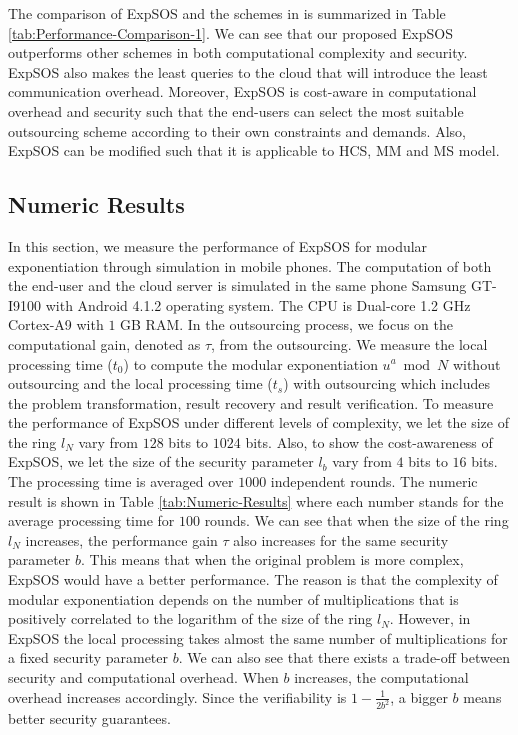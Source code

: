 \documentclass[english,draftcls,onecolumn,11pt]{IEEEtran}
\theoremstyle{definition}
\theoremstyle{plain}
\theoremstyle{plain}
\theoremstyle{definition}
\begin{document}
The comparison of ExpSOS and the schemes in \cite{hohenberger2005securely,chen2012new,wang2014securely}
is summarized in Table \ref{tab:Performance-Comparison-1}. We can
see that our proposed ExpSOS outperforms other schemes in both computational
complexity and security. ExpSOS also makes the least queries to the
cloud that will introduce the least communication overhead. Moreover,
ExpSOS is cost-aware in computational overhead and security such that
the end-users can select the most suitable outsourcing scheme according
to their own constraints and demands. Also, ExpSOS can be modified
such that it is applicable to HCS, MM and MS model.


\subsection{Numeric Results}

In this section, we measure the performance of ExpSOS for modular
exponentiation through simulation in mobile phones. The computation
of both the end-user and the cloud server is simulated in the same
phone Samsung GT-I9100 with Android 4.1.2 operating system. The CPU
is Dual-core 1.2 GHz Cortex-A9 with $1$ GB RAM. In the outsourcing
process, we focus on the computational gain, denoted as $\tau$, from
the outsourcing. We measure the local processing time ($t_{0}$) to
compute the modular exponentiation $u^{a}\bmod N$ without outsourcing
and the local processing time ($t_{s}$) with outsourcing which includes
the problem transformation, result recovery and result verification.
To measure the performance of ExpSOS under different levels of complexity,
we let the size of the ring $l_{N}$ vary from $128$ bits to $1024$
bits. Also, to show the cost-awareness of ExpSOS, we let the size
of the security parameter $l_{b}$ vary from $4$ bits to $16$ bits.
The processing time is averaged over $1000$ independent rounds. The
numeric result is shown in Table \ref{tab:Numeric-Results} where
each number stands for the average processing time for $100$ rounds.
We can see that when the size of the ring $l_{N}$ increases, the
performance gain $\tau$ also increases for the same security parameter
$b$. This means that when the original problem is more complex, ExpSOS
would have a better performance. The reason is that the complexity
of modular exponentiation depends on the number of multiplications
that is positively correlated to the logarithm of the size of the
ring $l_{N}$. However, in ExpSOS the local processing takes almost
the same number of multiplications for a fixed security parameter
$b$. We can also see that there exists a trade-off between security
and computational overhead. When $b$ increases, the computational
overhead increases accordingly. Since the verifiability is $1-\frac{1}{2b^{2}}$,
a bigger $b$ means better security guarantees. 
\end{document}
